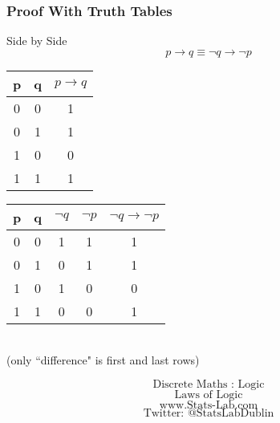 \documentclass{beamer}
\begin{document}


\begin{frame}
\frametitle{Proof With Truth Tables}
\Large
Side by Side
\[ p \rightarrow q \equiv \neg q \rightarrow \neg p\]
\bigskip
{ \Large
\hspace{0.5cm} \begin{tabular}{|c|c||c|}
\hline  p&  q& $p \rightarrow q$ \\ 
\hline  0&  0&  1\\ 
\hline  0&  1&  1\\ 
\hline  1&  0&  0\\ 
\hline  1&  1&  1\\ 
\hline 
\end{tabular} \hspace{0.5cm} \begin{tabular}{|c|c||c|c|c|}
\hline  p&  q& $\neg q$ & $\neg p$ & $\neg q \rightarrow \neg p$ \\ 
\hline  0&  0& 1& 1& 1\\ 
\hline  0&  1& 0& 1& 1\\ 
\hline  1&  0& 1& 0& 0\\ 
\hline  1&  1& 0& 0& 1\\ 
\hline 
\end{tabular}
}\\
\vspace{0.5cm}
(only ``difference" is first and last rows)
\end{frame}



\begin{frame}
\Huge
\[\mbox{Discrete Maths :  Logic}\]
\[\mbox{Laws of Logic}\]
\bigskip
\LARGE
\[\mbox{www.Stats-Lab.com}\]
\[\mbox{Twitter: @StatsLabDublin}\]
\end{frame}
\end{document}
